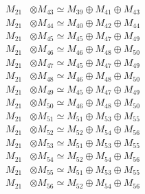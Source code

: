 \begin{align*}
M_{21} &\otimes M_{43} \simeq M_{39} \oplus M_{41} \oplus M_{43} \\
M_{21} &\otimes M_{44} \simeq M_{40} \oplus M_{42} \oplus M_{44} \\
M_{21} &\otimes M_{45} \simeq M_{45} \oplus M_{47} \oplus M_{49} \\
M_{21} &\otimes M_{46} \simeq M_{46} \oplus M_{48} \oplus M_{50} \\
M_{21} &\otimes M_{47} \simeq M_{45} \oplus M_{47} \oplus M_{49} \\
M_{21} &\otimes M_{48} \simeq M_{46} \oplus M_{48} \oplus M_{50} \\
M_{21} &\otimes M_{49} \simeq M_{45} \oplus M_{47} \oplus M_{49} \\
M_{21} &\otimes M_{50} \simeq M_{46} \oplus M_{48} \oplus M_{50} \\
M_{21} &\otimes M_{51} \simeq M_{51} \oplus M_{53} \oplus M_{55} \\
M_{21} &\otimes M_{52} \simeq M_{52} \oplus M_{54} \oplus M_{56} \\
M_{21} &\otimes M_{53} \simeq M_{51} \oplus M_{53} \oplus M_{55} \\
M_{21} &\otimes M_{54} \simeq M_{52} \oplus M_{54} \oplus M_{56} \\
M_{21} &\otimes M_{55} \simeq M_{51} \oplus M_{53} \oplus M_{55} \\
M_{21} &\otimes M_{56} \simeq M_{52} \oplus M_{54} \oplus M_{56} \\
\end{align*}

